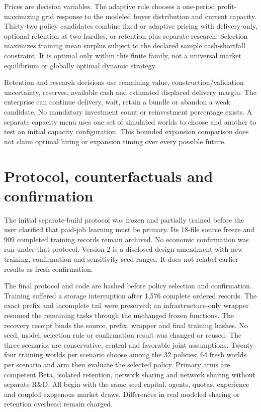 \documentclass[11pt,letterpaper]{article}
\begin{document}
Prices are decision variables. The adaptive rule chooses a one-period
profit-maximizing grid response to the modeled buyer distribution and current
capacity. Thirty-two policy candidates combine fixed or adaptive pricing with
delivery-only, optional retention at two hurdles, or retention plus separate
research. Selection maximizes training mean surplus subject to the declared
sample cash-shortfall constraint. It is optimal only within this finite family,
not a universal market equilibrium or globally optimal dynamic strategy.

Retention and research decisions use remaining value, construction/validation
uncertainty, reserves, available cash and estimated displaced delivery margin.
The enterprise can continue delivery, wait, retain a bundle or abandon a weak
candidate. No mandatory investment count or reinvestment percentage exists.
A separate capacity menu uses one set of simulated worlds to choose and another
to test an initial capacity configuration. This bounded expansion comparison
does not claim optimal hiring or expansion timing over every possible future.

\section{Protocol, counterfactuals and confirmation}

The initial separate-build protocol was frozen and partially trained before the
user clarified that paid-job learning must be primary. Its 18-file source freeze
and 909 completed training records remain archived. No economic confirmation
was run under that protocol. Version 2 is a disclosed design amendment with new
training, confirmation and sensitivity seed ranges. It does not relabel earlier
results as fresh confirmation.

The final protocol and code are hashed before policy selection and confirmation.
Training suffered a storage interruption after 1,576 complete ordered records.
The exact prefix and incomplete tail were preserved; an infrastructure-only
wrapper resumed the remaining tasks through the unchanged frozen functions.
The recovery receipt binds the source, prefix, wrapper and final training hashes.
No seed, model, selection rule or confirmation result was changed or reused.
The three scenarios are conservative, central and favorable joint assumptions.
Twenty-four training worlds per scenario choose among the 32 policies; 64 fresh
worlds per scenario and arm then evaluate the selected policy. Primary arms are
competent Beta, isolated retention, network sharing and network sharing without
separate R\&D. All begin with the same seed capital, agents, quotas, experience
and coupled exogenous market draws. Differences in real modeled sharing or
retention overhead remain charged.
\end{document}
